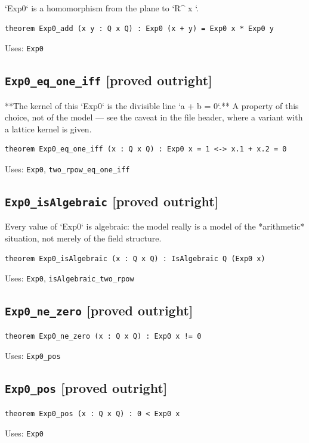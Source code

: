 \documentclass[11pt,a4paper]{article}
\newcommand{\tagpr}{\textcolor{provedc}{\textbf{[proved outright]}}}
\begin{document}
`Exp0` is a homomorphism from the plane to `R\^{} x `.

\begin{lstlisting}
theorem Exp0_add (x y : Q x Q) : Exp0 (x + y) = Exp0 x * Exp0 y
\end{lstlisting}
\noindent\footnotesize Uses: \texttt{Exp0}\normalsize


\subsection*{\texttt{Exp0\_eq\_one\_iff} \hfill \tagpr}

**The kernel of this `Exp0` is the divisible line `a + b = 0`.** A property of this choice, not of the model --- see the caveat in the file header, where a variant with a lattice kernel is given.

\begin{lstlisting}
theorem Exp0_eq_one_iff (x : Q x Q) : Exp0 x = 1 <-> x.1 + x.2 = 0
\end{lstlisting}
\noindent\footnotesize Uses: \texttt{Exp0}, \texttt{two\_rpow\_eq\_one\_iff}\normalsize


\subsection*{\texttt{Exp0\_isAlgebraic} \hfill \tagpr}

Every value of `Exp0` is algebraic: the model really is a model of the *arithmetic* situation, not merely of the field structure.

\begin{lstlisting}
theorem Exp0_isAlgebraic (x : Q x Q) : IsAlgebraic Q (Exp0 x)
\end{lstlisting}
\noindent\footnotesize Uses: \texttt{Exp0}, \texttt{isAlgebraic\_two\_rpow}\normalsize


\subsection*{\texttt{Exp0\_ne\_zero} \hfill \tagpr}
\begin{lstlisting}
theorem Exp0_ne_zero (x : Q x Q) : Exp0 x != 0
\end{lstlisting}
\noindent\footnotesize Uses: \texttt{Exp0\_pos}\normalsize


\subsection*{\texttt{Exp0\_pos} \hfill \tagpr}
\begin{lstlisting}
theorem Exp0_pos (x : Q x Q) : 0 < Exp0 x
\end{lstlisting}
\noindent\footnotesize Uses: \texttt{Exp0}\normalsize
\end{document}
